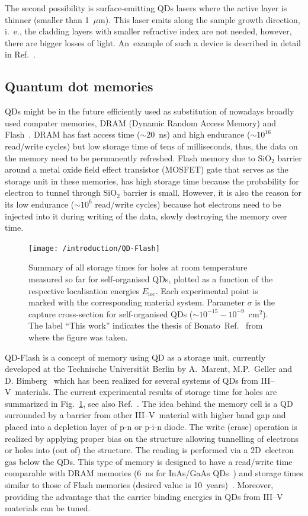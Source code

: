 \documentclass[
a4paper, %
11pt, %
onecolumn, %
openany, %
oldfontcommands,
]{memoir}
\begin{document}
The second possibility is surface-emitting QDs lasers where the active layer is thinner (smaller than 1~$\mu$m). This laser emits along the sample growth direction, i.~e., the cladding layers with smaller refractive index are not needed, however, there are bigger losses of light. An~example of such a device is described in detail in Ref.~\cite{Saito}.



\subsection*{Quantum dot memories}
QDs might be in the future efficiently used as substitution of nowadays broadly used computer memories, DRAM (Dynamic Random Access Memory) and Flash~\cite{Pavan,Sherwin}. DRAM has fast access time ($\sim$20~ns) and high endurance ($\sim10^{16}$ read/write cycles) but low storage time of tens of milliseconds, thus, the data on the memory need to be permanently refreshed. Flash memory due to SiO$_2$ barrier around a metal oxide field effect transistor (MOSFET) gate that serves as the storage unit in these memories, has high storage time because the probability for electron to tunnel through SiO$_2$ barrier is small. However, it is also the reason for its low endurance ($\sim 10^{6}$ read/write cycles) because hot electrons need to be injected into it during writing of the data, slowly destroying the memory over time. 
%
\begin{figure}
	\centering
	\texttt{[image: /introduction/QD-Flash]}
	\caption{Summary of all storage times for holes at room temperature measured so far for self-organised QDs, plotted as a function of the respective localisation energies $E_\mathrm{loc}$. Each experimental point is marked with the corresponding material system. Parameter $\sigma$ is the capture cross-section for self-organised QDs ($\sim10^{ -15} -10^ {-9}$~cm$^2$). The label \enquote{This work} indicates the thesis of Bonato~Ref.~\cite{t_bonato} from where the figure was taken.}
	\label{fig:intr:QD-flash}
\end{figure}

QD-Flash is a concept of memory using QD as a storage unit, currently developed at the Technische Universität Berlin by A.~Marent, M.P.~Geller and D. Bimberg~\cite{Marent_SST2011_QDFlash} which has been realized for several systems of QDs from III--V~materials. The current experimental results of storage time for holes are summarized in Fig.~\ref{fig:intr:QD-flash}, see also Ref.~\cite{t_bonato}. The idea behind the memory cell is a QD surrounded by a barrier from other III--V~material with higher band gap and placed into a depletion layer of p-n or p-i-n diode. The write (erase) operation is realized by applying proper bias on the structure allowing tunnelling of electrons or holes into (out of) the structure. The reading is performed via a 2D~electron gas below the QDs. This type of memory is designed to have a read/write time comparable with DRAM memories (6~ns for InAs/GaAs QDs~\cite{GellerAPL}) and storage times similar to those of Flash memories (desired value is 10~years)~\cite{GellerAPL,GellerJOP}. Moreover, providing the advantage that the carrier binding energies in QDs from III--V materials can be tuned. 
\end{document}
